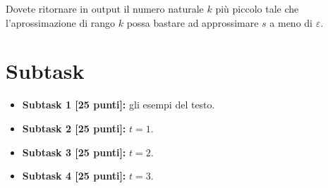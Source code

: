 
Dovete ritornare in output il numero naturale $k$ più piccolo tale che l'aprossimazione di rango $k$ possa bastare ad approssimare $s$ a meno di $\varepsilon$.






  
  \section*{Subtask}
  \begin{itemize}
    \item \textbf{Subtask 1 [25 punti]:} gli esempi del testo.
    \item \textbf{Subtask 2 [25 punti]:} $t=1$.
    \item \textbf{Subtask 3 [25 punti]:} $t=2$.
    \item \textbf{Subtask 4 [25 punti]:} $t=3$.
  \end{itemize}
  
